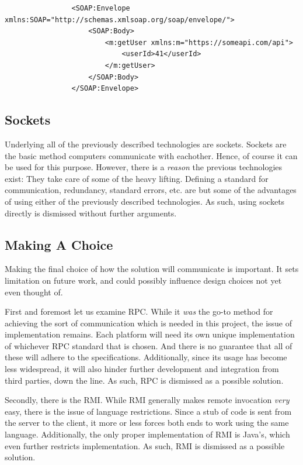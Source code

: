 			\begin{verbatim}
				<SOAP:Envelope xmlns:SOAP="http://schemas.xmlsoap.org/soap/envelope/">
				    <SOAP:Body>
				        <m:getUser xmlns:m="https://someapi.com/api">
				            <userId>41</userId>
				        </m:getUser>
				    </SOAP:Body>
				</SOAP:Envelope>
			\end{verbatim}

		\subsection{Sockets}
			Underlying all of the previously described technologies are sockets. Sockets are the basic method computers communicate with eachother. Hence, of course it can be used for this purpose. However, there is a \emph{reason} the previous technologies exist: They take care of some of the heavy lifting. Defining a standard for communication, redundancy, standard errors, etc. are but some of the advantages of using either of the previously described technologies. As such, using sockets directly is dismissed without further arguments. 

		\subsection{Making A Choice}
			\label{sec:design:choosing-rest}
			Making the final choice of how the solution will communicate is important. It sets limitation on future work, and could possibly influence design choices not yet even thought of. 

			First and foremost let us examine RPC. While it \emph{was} the go-to method for achieving the sort of communication which is needed in this project, the issue of implementation remains. Each platform will need its own unique implementation of whichever RPC standard that is chosen. And there is no guarantee that all of these will adhere to the specifications. Additionally, since its usage has become less widespread, it will also hinder further development and integration from third parties, down the line. As such, RPC is dismissed as a possible solution.

			Secondly, there is the RMI. While RMI generally makes remote invocation \emph{very} easy, there is the issue of language restrictions. Since a stub of code is sent from the server to the client, it more or less forces both ends to work using the same language. Additionally, the only proper implementation of RMI is Java's, which even further restricts implementation. As such, RMI is dismissed as a possible solution.

